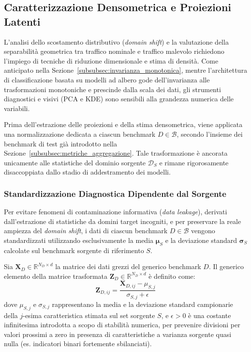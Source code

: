 \subsection{Caratterizzazione Densometrica e Proiezioni Latenti}
\label{subsec:proiezioni_densita}

L'analisi dello scostamento distributivo (\textit{domain shift}) e la valutazione della separabilità geometrica tra traffico nominale e traffico malevolo richiedono l'impiego di tecniche di riduzione dimensionale e stima di densità. Come anticipato nella Sezione~\ref{subsubsec:invarianza_monotonica}, mentre l'architettura di classificazione basata su modelli ad albero gode dell'invarianza alle trasformazioni monotoniche e prescinde dalla scala dei dati, gli strumenti diagnostici e visivi (PCA e KDE) sono sensibili alla grandezza numerica delle variabili.

Prima dell'estrazione delle proiezioni e della stima densometrica, viene applicata una normalizzazione dedicata a ciascun benchmark $D \in \mathcal{B}$, secondo l'insieme dei benchmark di test già introdotto nella Sezione~\ref{subsubsec:metriche_aggregazione}. Tale trasformazione è ancorata unicamente alle statistiche del dominio sorgente $\mathcal{D}_S$ e rimane rigorosamente disaccoppiata dallo stadio di addestramento dei modelli.

\subsubsection{Standardizzazione Diagnostica Dipendente dal Sorgente}
\label{subsubsec:zscore_sorgente}
Per evitare fenomeni di contaminazione informativa (\textit{data leakage}), derivati dall'estrazione di statistiche da domini target incogniti, e per preservare la reale ampiezza del \textit{domain shift}, i dati di ciascun benchmark $D \in \mathcal{B}$ vengono standardizzati utilizzando esclusivamente la media $\boldsymbol{\mu}_S$ e la deviazione standard $\boldsymbol{\sigma}_S$ calcolate sul benchmark sorgente di riferimento $S$.

Sia $\mathbf{X}_D \in \mathbb{R}^{N_D \times d}$ la matrice dei dati grezzi del generico benchmark $D$. Il generico elemento della matrice trasformata $\mathbf{Z}_D \in \mathbb{R}^{N_D \times d}$ è definito come:
\begin{equation}
    \mathbf{Z}_{D, ij} = \frac{\mathbf{X}_{D, ij} - \mu_{S, j}}{\sigma_{S, j} + \epsilon}
    \label{eq:z_score_source}
\end{equation}
dove $\mu_{S, j}$ e $\sigma_{S, j}$ rappresentano la media e la deviazione standard campionarie della $j$-esima caratteristica stimata sul set sorgente $S$, e $\epsilon > 0$ è una costante infinitesima introdotta a scopo di stabilità numerica, per prevenire divisioni per valori prossimi a zero in presenza di caratteristiche a varianza sorgente quasi nulla (es. indicatori binari fortemente sbilanciati).

